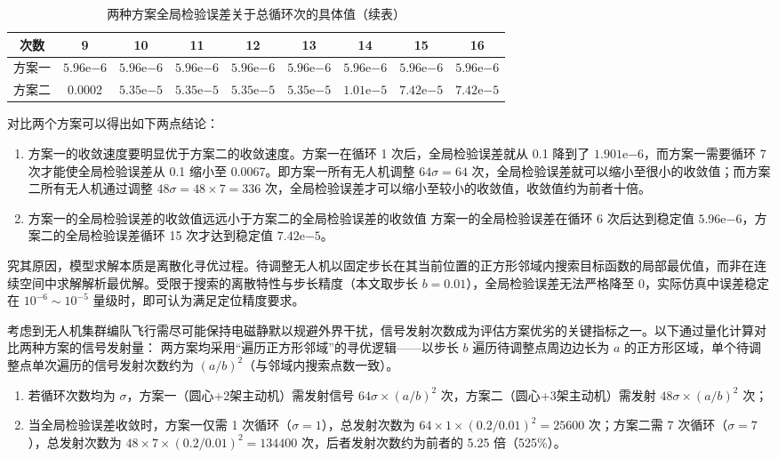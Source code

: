 \documentclass[withoutpreface,bwprint]{cumcmthesis} %
\begin{document}
\begin{table}[H]
  \centering
  \caption{两种方案全局检验误差关于总循环次的具体值（续表）}
  \label{tab:error_cycle_continue}
  \begin{tabular}{ccccccccc}
    \toprule
    次数 & 9 & 10 & 11 & 12 & 13 & 14 & 15 & 16 \\
    \midrule
    方案一 & $5.96\mathrm{e}{-6}$ & $5.96\mathrm{e}{-6}$ & $5.96\mathrm{e}{-6}$ & $5.96\mathrm{e}{-6}$ & $5.96\mathrm{e}{-6}$ & $5.96\mathrm{e}{-6}$ & $5.96\mathrm{e}{-6}$ & $5.96\mathrm{e}{-6}$ \\
    方案二 & 0.0002 & $5.35\mathrm{e}{-5}$ & $5.35\mathrm{e}{-5}$ & $5.35\mathrm{e}{-5}$ & $5.35\mathrm{e}{-5}$ & $1.01\mathrm{e}{-5}$ & $7.42\mathrm{e}{-5}$ & $7.42\mathrm{e}{-5}$ \\
    \bottomrule
  \end{tabular}
\end{table}

对比两个方案可以得出如下两点结论：

\begin{enumerate}
    \item 方案一的收敛速度要明显优于方案二的收敛速度。方案一在循环 1 次后，全局检验误差就从 0.1 降到了 $1.901\mathrm{e}{-6}$，而方案一需要循环 7 次才能使全局检验误差从 0.1 缩小至 0.0067。即方案一所有无人机调整 $64\sigma = 64$ 次，全局检验误差就可以缩小至很小的收敛值；而方案二所有无人机通过调整 $48\sigma = 48 \times 7 = 336$ 次，全局检验误差才可以缩小至较小的收敛值，收敛值约为前者十倍。

    \item 方案一的全局检验误差的收敛值远远小于方案二的全局检验误差的收敛值
方案一的全局检验误差在循环 6 次后达到稳定值 $5.96\mathrm{e}{-6}$，方案二的全局检验误差循环 15 次才达到稳定值 $7.42\mathrm{e}{-5}$。
\end{enumerate}


究其原因，模型求解本质是离散化寻优过程。待调整无人机以固定步长在其当前位置的正方形邻域内搜索目标函数的局部最优值，而非在连续空间中求解解析最优解。受限于搜索的离散特性与步长精度（本文取步长 \( b = 0.01 \)），全局检验误差无法严格降至 0，实际仿真中误差稳定在 \( 10^{-6} \sim 10^{-5} \) 量级时，即可认为满足定位精度要求。


考虑到无人机集群编队飞行需尽可能保持电磁静默以规避外界干扰，信号发射次数成为评估方案优劣的关键指标之一。以下通过量化计算对比两种方案的信号发射量：  
两方案均采用“遍历正方形邻域”的寻优逻辑——以步长 \( b \) 遍历待调整点周边边长为 \( a \) 的正方形区域，单个待调整点单次遍历的信号发射次数约为 \( (a/b)^2 \)（与邻域内搜索点数一致）。  
\begin{enumerate}
    \item 若循环次数均为 \( \sigma \)，方案一（圆心+2架主动机）需发射信号 \( 64\sigma \times (a/b)^2 \) 次，方案二（圆心+3架主动机）需发射 \( 48\sigma \times (a/b)^2 \) 次；
    \item 当全局检验误差收敛时，方案一仅需 1 次循环（\( \sigma = 1 \)），总发射次数为 \( 64 \times 1 \times (0.2/0.01)^2 = 25600 \) 次；方案二需 7 次循环（\( \sigma = 7 \)），总发射次数为 \( 48 \times 7 \times (0.2/0.01)^2 = 134400 \) 次，后者发射次数约为前者的 5.25 倍（525\%）。  
\end{enumerate}
\end{document}
